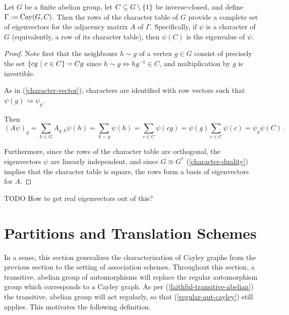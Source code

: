 \documentclass{report}
\begin{document}
    \begin{lem}\label{cayley-eigen}
      Let $G$ be a finite abelian group,
      let $C \subseteq G \setminus \left\lbrace 1 \right\rbrace$ be inverse-closed,
      and define $\Gamma := \operatorname{Cay}(G, C)$.
      Then the rows of the character table of $G$ provide a complete set of
      eigenvectors for the adjacency matrix $A$ of $\Gamma$.
      Specifically, if $\psi$ is a character of $G$ (equivalently, a row of
      its character table), then $\psi(C)$ is the eigenvalue of $\psi$.
    \end{lem}

    \begin{proof}
      Note first that the neighbours $h \sim g$ of a vertex $g \in G$ consist of
      precisely the set $\left\lbrace  cg \ \middle| \ c \in C  \right\rbrace = Cg$ since $h \sim g \iff
      hg^{-1} \in C$, and multiplication by $g$ is invertible.

      As in (\ref{character-vector}), characters are identified with row vectors
      such that $\psi(g) \rightsquigarrow \psi_g$.

      Then
      $$
        (A\psi)_g = \sum_{h \in G} A_{g, h} \psi(h)
        = \sum_{h \sim g} \psi(h) = \sum_{c \in C} \psi(cg)
        = \psi(g) \sum_{c \in C} \psi(c) = \psi_g \psi(C)
        \ .
      $$

      Furthermore, since the rows of the character table are orthogonal,
      the eigenvectors $\psi$ are linearly independent,
      and since $G \cong G^*$ (\ref{character-duality}) implies that the character table is square,
      the rows form a basis of eigenvectors for $A$.
    \end{proof}

    TODO How to get real eigenvectors out of this?

  \section{Partitions and Translation Schemes}\label{sec:AS:translation}

    In a sense, this section generalizes the characterization of Cayley graphs
    from the previous section to the setting of association schemes.
    Throughout this section, a transitive, abelian group of automorphisms will
    replace the regular automorphism group which corresponds to a Cayley graph.
    As per (\ref{faithful-transitive-abelian}) the transitive, abelian group
    will act regularly, so that (\ref{regular-aut-cayley}) still applies.
    This motivates the following definition.
\end{document}
